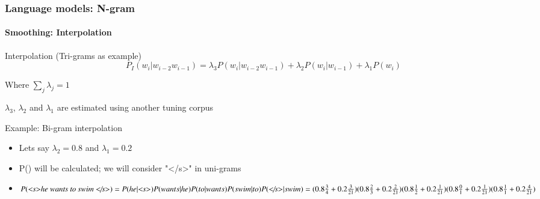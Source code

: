 \documentclass[xcolor=table]{beamer}
\begin{document}
\begin{frame}
\frametitle{Language models: N-gram}
\framesubtitle{Smoothing: Interpolation}

\begin{block}{Interpolation (Tri-grams as example)}
	\[%
	P_{I}(w_i | w_{i-2} w_{i-1}) = 
	\lambda_3 P(w_i | w_{i-2} w_{i-1}) 
	+ \lambda_2 P(w_i | w_{i-1}) 
	+ \lambda_1 P(w_i) 
	\]
	
	Where $\sum_j \lambda_j = 1$
	
	$\lambda_3$, $\lambda_2$ and $\lambda_1$ are estimated using another tuning corpus
\end{block}

\vspace{-6pt}
\begin{exampleblock}{Example: Bi-gram interpolation}
	\begin{itemize}
		\item Lets say $\lambda_2=0.8$ and $\lambda_1=0.2$
		\item P() will be calculated; we will consider "\textless/s\textgreater" in uni-grams
		\item $P(\text{\textit{\textless s\textgreater he wants to swim \textless/s\textgreater}}) = 
		P(he|\text{\textit{\textless s\textgreater}}) P(wants|he) P(to|wants) P(swim|to) P(\text{\textit{\textless/s\textgreater}}|swim) = 
		(0.8\frac{3}{4} + 0.2\frac{3}{21}) (0.8\frac{2}{3} + 0.2\frac{2}{21}) (0.8\frac{1}{2} + 0.2\frac{1}{21}) (0.8\frac{0}{1} + 0.2\frac{1}{21}) (0.8\frac{1}{1} + 0.2\frac{4}{21})$
	\end{itemize}
\end{exampleblock}

\end{frame}
\end{document}
